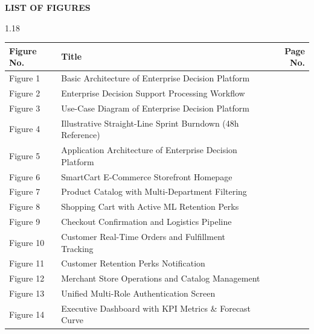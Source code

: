 \documentclass[12pt,a4paper]{article}
\begin{document}
\vspace*{0.2in}
\begin{center}{\large\bfseries LIST OF FIGURES}\end{center}
\vspace{0.1in}
\begin{spacing}{1.18}
\small
\noindent\begin{tabular}{p{2cm}p{10.5cm}r}
\textbf{Figure No.} & \textbf{Title} & \textbf{Page No.}\\ \hline
Figure 1 & Basic Architecture of Enterprise Decision Platform & \pageref{fig:basic_architecture}\\
Figure 2 & Enterprise Decision Support Processing Workflow & \pageref{fig:workflow_diagram}\\
Figure 3 & Use-Case Diagram of Enterprise Decision Platform & \pageref{fig:use_case_diagram}\\
Figure 4 & Illustrative Straight-Line Sprint Burndown (48h Reference) & \pageref{fig:ideal_burndown}\\
Figure 5 & Application Architecture of Enterprise Decision Platform & \pageref{fig:application_architecture}\\
Figure 6 & SmartCart E-Commerce Storefront Homepage & \pageref{fig:assets/screenshots/smartcart_home.png}\\
Figure 7 & Product Catalog with Multi-Department Filtering & \pageref{fig:assets/screenshots/product_catalog.png}\\
Figure 8 & Shopping Cart with Active ML Retention Perks & \pageref{fig:assets/screenshots/shopping_cart.png}\\
Figure 9 & Checkout Confirmation and Logistics Pipeline & \pageref{fig:assets/screenshots/checkout_confirmation.png}\\
Figure 10 & Customer Real-Time Orders and Fulfillment Tracking & \pageref{fig:assets/screenshots/customer_orders.png}\\
Figure 11 & Customer Retention Perks Notification & \pageref{fig:assets/screenshots/customer_notifications.png}\\
Figure 12 & Merchant Store Operations and Catalog Management & \pageref{fig:assets/screenshots/admin_product_manager.png}\\
Figure 13 & Unified Multi-Role Authentication Screen & \pageref{fig:assets/screenshots/login_screen.png}\\
Figure 14 & Executive Dashboard with KPI Metrics \& Forecast Curve & \pageref{fig:assets/screenshots/executive_dashboard.png}\\

\end{tabular}
\end{spacing}
\end{document}
